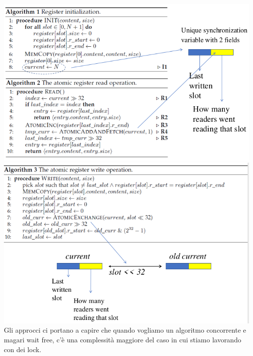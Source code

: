 \documentclass[12pt, oneside]{extbook}
\begin{document}
\includegraphics[scale=0.7]{immagini/atom_reg_1}\\
\includegraphics[scale=0.7]{immagini/atom_reg_2}\\
Gli approcci ci portano a capire che quando vogliamo un algoritmo concorrente e magari wait free, c'è una complessità maggiore del caso in cui stiamo lavorando con dei lock.
\end{document}
